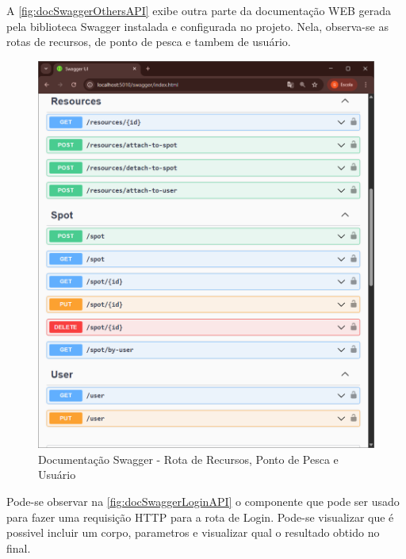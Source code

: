 A \autoref{fig:docSwaggerOthersAPI} exibe outra parte da documentação WEB gerada pela biblioteca Swagger instalada e configurada no projeto. Nela, observa-se as rotas de recursos, de ponto de pesca e tambem de usuário.

\begin{figure}[H]
    \centering
    \caption{Documentação Swagger - Rota de Recursos, Ponto de Pesca e Usuário}
    \label{fig:docSwaggerOthersAPI}
    \includegraphics[scale=0.60]{./dados/figuras/swagger-api-others.png}
\end{figure}

\newpage

Pode-se observar na \autoref{fig:docSwaggerLoginAPI} o componente que pode ser usado para fazer uma requisição HTTP para a rota de Login. Pode-se visualizar que é possivel incluir um corpo, parametros e visualizar qual o resultado obtido no final.

